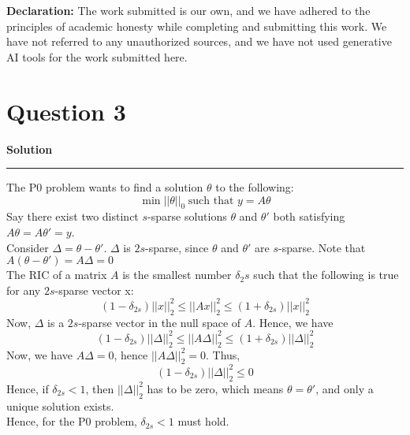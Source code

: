 \documentclass[a4paper,12pt]{article}
\title{\cooltitle{CS754 Assignment-1}}
\author{{\bf Saksham Rathi, Ekansh Ravi Shankar, Kshitij Vaidya}}
\date{}
\newenvironment{solution}[2][]{%
    \begin{mdframed}[linecolor=blue!70!black, linewidth=2pt, roundcorner=10pt, backgroundcolor=yellow!10!white, skipabove=12pt, skipbelow=12pt]%
        \textbf{\large #2}
        \par\noindent\rule{\textwidth}{0.4pt}
}{
    \end{mdframed}
}
\begin{document}
\maketitle
\textbf{Declaration:} The work submitted is our own, and
we have adhered to the principles of academic honesty while completing and submitting this work. We have not
referred to any unauthorized sources, and we have not used generative AI tools for the work submitted here.

\section*{Question 3}

\begin{solution}{Solution}
The P0 problem wants to find a solution $\theta$ to the following:
\[
\min ||\theta||_0 \hspace{3pt}\text{such that} \hspace{4pt}y=A\theta
\]
Say there exist two distinct $s$-sparse solutions $\theta$ and $\theta'$ both satisfying $A\theta = A\theta' = y$.\\
Consider $\Delta = \theta-\theta'$. $\Delta$ is $2s$-sparse, since $\theta$ and $\theta'$ are $s$-sparse. Note that $A(\theta - \theta') = A\Delta = 0$\\
The RIC of a matrix $A$ is the smallest number $\delta_2s$ such that the following is true for any $2s$-sparse vector x:
\[
(1-\delta_{2s})||x||_2^2 \leq ||Ax||_2^2 \leq (1+\delta_{2s})||x||_2^2 
\]
Now, $\Delta$ is a $2s$-sparse vector in the null space of $A$. Hence, we have
\[
(1-\delta_{2s})||\Delta||_2^2 \leq ||A\Delta||_2^2 \leq (1+\delta_{2s})||\Delta||_2^2
\]
Now, we have $A\Delta = 0$, hence $||A\Delta||_2^2 = 0$. Thus,
\[
(1-\delta_{2s})||\Delta||_2^2 \leq 0
\]
Hence, if $\delta_{2s} < 1$, then $||\Delta||_2^2$ has to be zero, which means $\theta = \theta'$, and only a unique solution exists.\\
Hence, for the P0 problem, $\delta_{2s} < 1$ must hold.
\end{solution}
\end{document}
